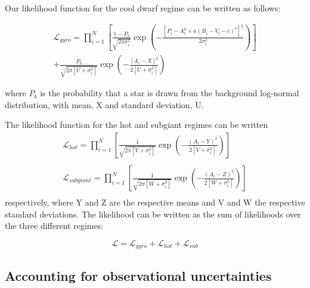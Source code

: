 \documentclass[10pt,preprint]{aastex}
\begin{document}
Our likelihood function for the cool dwarf regime can be written as follows:


\begin{eqnarray}
	\mathcal{L}_{gyro} = \prod_{i=1}^N \left[ \frac{1-P_b}{\sqrt{2\pi\sigma_{i}^2}}
	\exp\left({-\frac{\left[P_i - A_i^n \times a(B_i-V_i-c)^b\right]^2}{2\sigma_{i}^2}} \right)  \right] \nonumber \\
	+ \frac{P_b}{\sqrt{2\pi[U+\sigma_{i}^2]}} \exp \left( -\frac{[A_i - X]^2}{2[U+\sigma_{i}^2]}  \right)
\end{eqnarray}
\label{eq:likelihood}

where $P_b$ is the probability that a star is drawn from the background log-normal distribution, with mean, X and standard deviation, U.

The likelihood function for the hot and subgiant regimes can be written
\begin{eqnarray}
	\mathcal{L}_{hot} = \prod_{i=1}^N \left[ \frac{1}{\sqrt{2\pi[V+\sigma_{i}^2]}}
	\exp\left({-\frac{\left(A_{i}- Y\right)^2} {2[V+\sigma_{i}^2]}} \right)  \right] \\
	\nonumber \\
	\mathcal{L}_{subgiant} = \prod_{i=1}^N \left[ \frac{1}{\sqrt{2\pi[W+\sigma_{i}^2]}}
	\exp\left({-\frac{\left(A_{i}- Z\right)^2} {2[W+\sigma_{i}^2]}} \right)  \right] \nonumber \\
\end{eqnarray}
respectively, where Y and Z are the respective means and V and W the respective standard deviations.
The likelihood can be written as the sum of likelihoods over the three different regimes:%

\begin{equation}
	\mathcal{L} = \mathcal{L}_{gyro} + \mathcal{L}_{hot} + \mathcal{L}_{sub}
\end{equation}

\subsection{Accounting for observational uncertainties}
\end{document}
